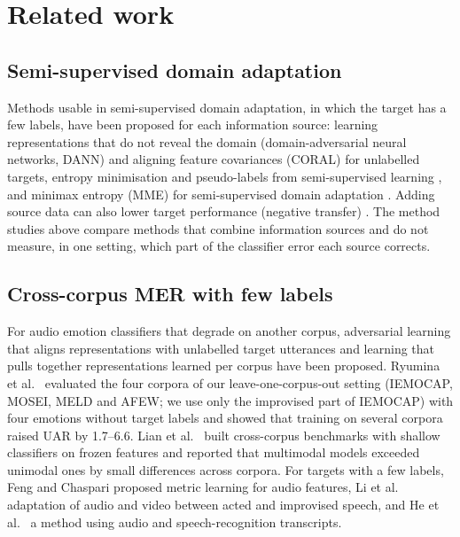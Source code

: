 \section{Related work}\label{sec:related}

\subsection{Semi-supervised domain adaptation}
Methods usable in semi-supervised domain adaptation, in which the target has a few labels, have been proposed for each information source: learning representations that do not reveal the domain (domain-adversarial neural networks, DANN) \cite{ganin2016dann} and aligning feature covariances (CORAL) \cite{sun2016coral} for unlabelled targets, entropy minimisation and pseudo-labels from semi-supervised learning \cite{grandvalet2004,lee2013pseudolabel}, and minimax entropy (MME) for semi-supervised domain adaptation \cite{saito2019mme}. Adding source data can also lower target performance (negative transfer) \cite{wang2019negative}. The method studies above compare methods that combine information sources and do not measure, in one setting, which part of the classifier error each source corrects.

\subsection{Cross-corpus MER with few labels}
For audio emotion classifiers that degrade on another corpus, adversarial learning that aligns representations with unlabelled target utterances \cite{abdelwahab2018dann} and learning that pulls together representations learned per corpus \cite{gideon2021addog} have been proposed. Ryumina et al.\ \cite{ryumina2025} evaluated the four corpora of our leave-one-corpus-out setting (IEMOCAP, MOSEI, MELD and AFEW; we use only the improvised part of IEMOCAP) with four emotions without target labels and showed that training on several corpora raised UAR by 1.7--6.6\pt. Lian et al.\ \cite{lian2026merbench} built cross-corpus benchmarks with shallow classifiers on frozen features and reported that multimodal models exceeded unimodal ones by small differences across corpora. For targets with a few labels, Feng and Chaspari \cite{feng2023} proposed metric learning for audio features, Li et al.\ \cite{li2021acted} adaptation of audio and video between acted and improvised speech, and He et al.\ \cite{he2025m4ser} a method using audio and speech-recognition transcripts.

